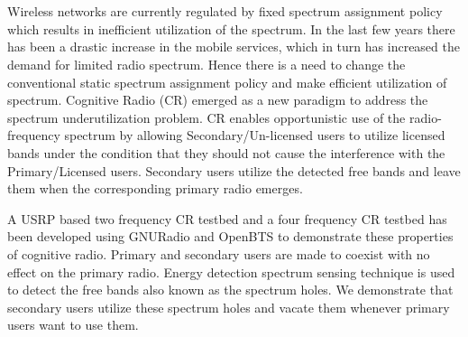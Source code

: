 \chapter*{}
Wireless networks are currently regulated by fixed spectrum assignment policy
which results in inefficient utilization of the spectrum. In the last few
years there has been a drastic increase in the mobile services, which in turn
has increased the demand for limited radio spectrum. Hence there is a need to
change the conventional static spectrum assignment policy and make efficient
utilization of spectrum. Cognitive Radio (CR) emerged as a new paradigm to
address the spectrum underutilization problem.  CR enables opportunistic use
of the radio-frequency spectrum by allowing Secondary/Un-licensed users to
utilize licensed bands under the condition that they should not cause the
interference with the Primary/Licensed users. Secondary users utilize the
detected free bands and leave them when the corresponding primary radio
emerges.

A USRP based two frequency CR testbed and a four frequency CR testbed has been
developed using GNURadio and OpenBTS to demonstrate these properties of
cognitive radio. Primary and secondary users are made to coexist with no
effect on the primary radio. Energy detection spectrum sensing technique is
used to detect the free bands also known as the spectrum holes. We demonstrate
that secondary users utilize these spectrum holes and vacate them whenever
primary users want to use them.
